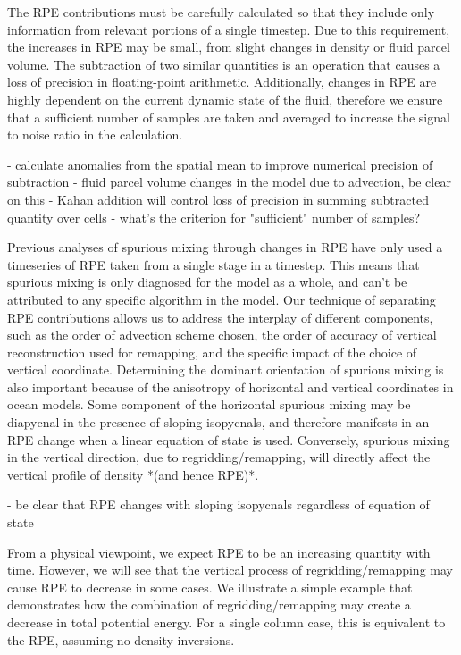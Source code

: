 The RPE contributions must be carefully calculated so that they include only information from relevant portions of a single timestep. Due to this requirement, the increases in RPE may be small, from slight changes in density or fluid parcel volume. The subtraction of two similar quantities is an operation that causes a loss of precision in floating-point arithmetic. Additionally, changes in RPE are highly dependent on the current dynamic state of the fluid, therefore we ensure that a sufficient number of samples are taken and averaged to increase the signal to noise ratio in the calculation.

- calculate anomalies from the spatial mean to improve numerical precision of subtraction
- fluid parcel volume changes in the model due to advection, be clear on this
- Kahan addition will control loss of precision in summing subtracted quantity over cells
- what's the criterion for "sufficient" number of samples?

Previous analyses of spurious mixing through changes in RPE have only used a timeseries of RPE taken from a single stage in a timestep. This means that spurious mixing is only diagnosed for the model as a whole, and can't be attributed to any specific algorithm in the model. Our technique of separating RPE contributions allows us to address the interplay of different components, such as the order of advection scheme chosen, the order of accuracy of vertical reconstruction used for remapping, and the specific impact of the choice of vertical coordinate. Determining the dominant orientation of spurious mixing is also important because of the anisotropy of horizontal and vertical coordinates in ocean models. Some component of the horizontal spurious mixing may be diapycnal in the presence of sloping isopycnals, and therefore manifests in an RPE change when a linear equation of state is used. Conversely, spurious mixing in the vertical direction, due to regridding/remapping, will directly affect the vertical profile of density *(and hence RPE)*.

- be clear that RPE changes with sloping isopycnals regardless of equation of state

From a physical viewpoint, we expect RPE to be an increasing quantity with time. However, we will see that the vertical process of regridding/remapping may cause RPE to decrease in some cases. We illustrate a simple example that demonstrates how the combination of regridding/remapping may create a decrease in total potential energy. For a single column case, this is equivalent to the RPE, assuming no density inversions.

